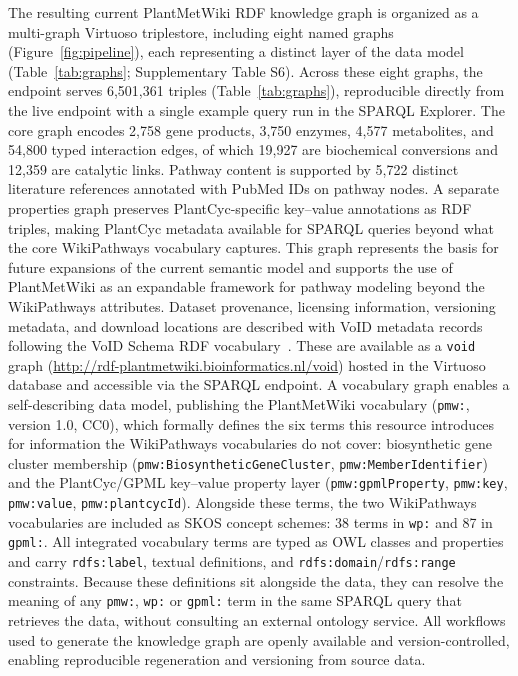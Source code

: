 \documentclass[11pt,a4paper]{article}
\newcommand{\rev}[1]{#1}
\begin{document}
The resulting current PlantMetWiki RDF knowledge graph is organized as a multi-graph Virtuoso
triplestore, including eight named graphs (Figure~\ref{fig:pipeline}), each representing a distinct
layer of the data model (Table~\ref{tab:graphs}; Supplementary Table S6). Across these eight graphs,
the endpoint serves 6,501,361 triples (Table~\ref{tab:graphs}), reproducible directly
from the live endpoint with a single example query run in the SPARQL Explorer. The core graph encodes 2,758 gene products, 3,750 enzymes,
4,577 metabolites, and 54,800 typed interaction edges, of which 19,927 are biochemical conversions
and 12,359 are catalytic links. Pathway content is supported by \rev{5,722} distinct literature references
annotated with PubMed IDs on pathway nodes. A separate properties graph preserves PlantCyc-specific
key--value annotations as RDF triples, making PlantCyc metadata available for SPARQL queries beyond
what the core WikiPathways vocabulary captures. This graph represents the basis for future
expansions of the current semantic model and supports the use of PlantMetWiki as an expandable
framework for pathway modeling beyond the WikiPathways attributes. Dataset provenance, licensing
information, versioning metadata, and download locations are described with VoID metadata records
following the VoID Schema RDF vocabulary~\cite{alexander2011}. These are available as a \texttt{void}
graph (\url{http://rdf-plantmetwiki.bioinformatics.nl/void}) hosted in the Virtuoso database and
accessible via the SPARQL endpoint. A vocabulary graph enables a self-describing data model, publishing the PlantMetWiki vocabulary (\texttt{pmw:}, version
1.0, CC0), which formally defines the six terms this resource introduces for information the
WikiPathways vocabularies do not cover: biosynthetic gene cluster membership
(\texttt{pmw:BiosyntheticGeneCluster}, \texttt{pmw:MemberIdentifier}) and the PlantCyc/GPML
key--value property layer (\texttt{pmw:gpmlProperty}, \texttt{pmw:key}, \texttt{pmw:value},
\texttt{pmw:plantcycId}). Alongside these terms, the two WikiPathways vocabularies are
included as SKOS concept schemes: 38 terms in \texttt{wp:} and 87 in \texttt{gpml:}. All integrated vocabulary terms are typed as OWL
classes and properties and carry \texttt{rdfs:label}, textual definitions, and
\texttt{rdfs:domain}/\texttt{rdfs:range} constraints. Because these definitions sit alongside the
data, they can resolve the meaning of any \texttt{pmw:}, \texttt{wp:} or \texttt{gpml:} term in
the same SPARQL query that retrieves the data, without consulting an external ontology service. All
workflows used to generate the knowledge graph are openly available and version-controlled, enabling
reproducible regeneration and versioning from source data.
\end{document}
